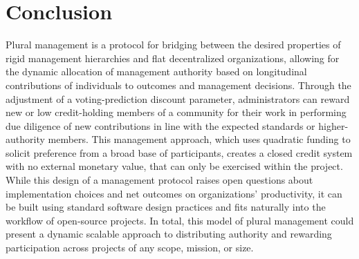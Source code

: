 \documentclass{article}
\begin{document}
\section{Conclusion}
Plural management is a protocol for bridging between the desired properties of rigid management hierarchies and flat decentralized organizations, allowing for the dynamic allocation of management authority based on longitudinal contributions of individuals to outcomes and management decisions. Through the adjustment of a voting-prediction discount parameter, administrators can reward new or low credit-holding members of a community for their work in performing due diligence of new contributions in line with the expected standards or higher-authority members. This management approach, which uses quadratic funding to solicit preference from a broad base of participants, creates a closed credit system with no external monetary value, that can only be exercised within the project. While this design of a management protocol raises open questions about implementation choices and net outcomes on organizations' productivity, it can be built using standard software design practices and fits naturally into the workflow of open-source projects. In total, this model of plural management could present a dynamic scalable approach to distributing authority and rewarding participation across projects of any scope, mission, or size.
\end{document}
